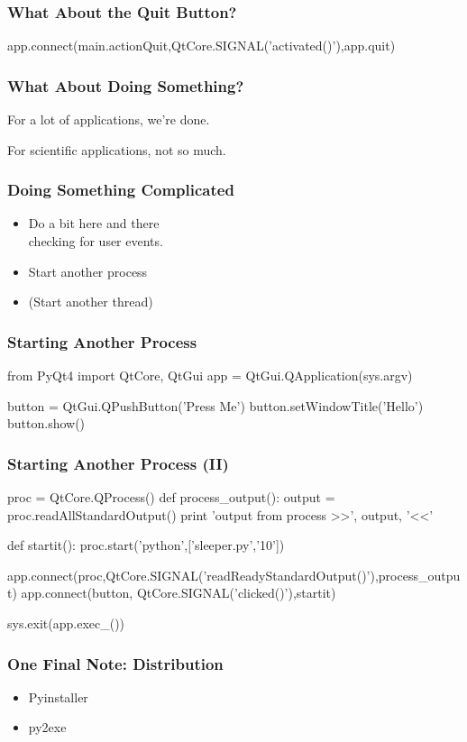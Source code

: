 \begin{frame}[fragile]
\frametitle{What About the Quit Button?}
\begin{python}
app.connect(main.actionQuit,QtCore.SIGNAL('activated()'),app.quit)
\end{python}
\end{frame}

\begin{frame}[fragile]
\frametitle{What About Doing Something?}

For a lot of applications, we're done.

For scientific applications, not so much.
\end{frame}

\begin{frame}[fragile]
\frametitle{Doing Something Complicated}
\begin{itemize}
\item Do a bit here and there\\
    checking for user events.
\item Start another process
\item (Start another thread)
\end{itemize}
\end{frame}

\begin{frame}[fragile]
\frametitle{Starting Another Process}
\begin{python}
from PyQt4 import QtCore, QtGui
app = QtGui.QApplication(sys.argv)

button = QtGui.QPushButton('Press Me')
button.setWindowTitle('Hello')
button.show()


\end{python}

\end{frame}
\begin{frame}[fragile]
\frametitle{Starting Another Process (II)}
\begin{python}

proc = QtCore.QProcess()
def process_output():
    output = proc.readAllStandardOutput()
    print 'output from process >>', output, '<<'

def startit():
    proc.start('python',['sleeper.py','10'])

app.connect(proc,QtCore.SIGNAL('readReadyStandardOutput()'),process_output)
app.connect(button, QtCore.SIGNAL('clicked()'),startit)

sys.exit(app.exec_())
\end{python}
\end{frame}

\begin{frame}[fragile]
\frametitle{One Final Note: Distribution}
\begin{itemize}
\item Pyinstaller
\item py2exe
\end{itemize}
\end{frame}

